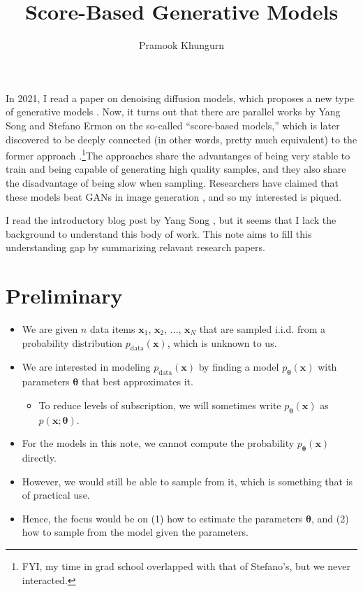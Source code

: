 \documentclass[10pt]{article}
\title{Score-Based Generative Models}
\author{Pramook Khungurn}
\newcommand{\ve}[1]{\mathbf{#1}}
\newcommand{\mrm}[1]{\mathrm{#1}}
\begin{document}
\maketitle

In 2021, I read a paper on denoising diffusion models, which proposes a new type of generative models \cite{Ho:2020}. Now, it turns out that there are parallel works by Yang Song and Stefano Ermon on the so-called ``score-based models,'' which is later discovered to be deeply connected (in other words, pretty much equivalent) to the former approach \cite{Song:2019}.\footnote{FYI, my time in grad school overlapped with that of Stefano's, but we never interacted.}The approaches share the advantanges of being very stable to train and being capable of generating high quality samples, and they also share the disadvantage of being slow when sampling. Researchers have claimed that these models beat GANs in image generation \cite{Dhariwal:2021}, and so my interested is piqued.

I read the introductory blog post by Yang Song \cite{Song:2022}, but it seems that I lack the background to understand this body of work. This note aims to fill this understanding gap by summarizing relavant research papers.

\section{Preliminary}

\begin{itemize}
  \item We are given $n$ data items $\ve{x}_1$, $\ve{x}_2$, $\dotsc$, $\ve{x}_N$ that are sampled i.i.d. from a probability distribution $p_{\mrm{data}}(\ve{x})$, which is unknown to us.
  
  \item We are interested in modeling $p_{\mrm{data}}(\ve{x})$ by finding a model $p_{\boldsymbol{\theta}}(\ve{x})$ with parameters $\boldsymbol{\theta}$ that best approximates it.
  \begin{itemize}
    \item To reduce levels of subscription, we will sometimes write $p_{\boldsymbol{\theta}}(\ve{x})$ as $p(\ve{x};\boldsymbol{\theta})$.
  \end{itemize}

  \item For the models in this note, we cannot compute the probability $p_{\boldsymbol{\theta}}(\ve{x})$ directly.
  
  \item However, we would still be able to sample from it, which is something that is of practical use.
  
  \item Hence, the focus would be on (1) how to estimate the parameters $\boldsymbol{\theta}$, and (2) how to sample from the model given the parameters.
\end{itemize}
\end{document}
